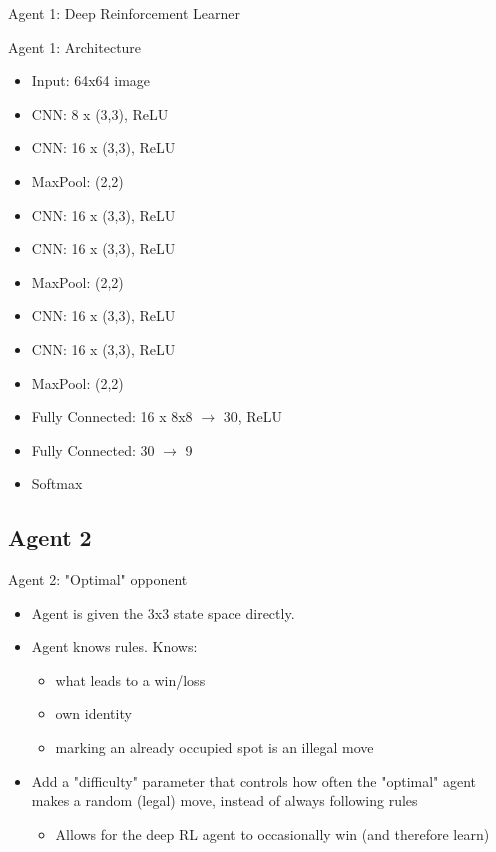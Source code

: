 \documentclass[11pt]{beamer}
\begin{document}
\begin{frame}{Agent 1: Deep Reinforcement Learner}
\begin{minipage}[t]{0.45\linewidth}
\begin{figure}[tttDL]
		\end{figure}
	\end{minipage}
\end{frame}

\begin{frame}{Agent 1: Architecture}
	\begin{itemize}
		\item Input: 64x64 image
		\item CNN: 8  x (3,3), ReLU
		\item[] CNN: 16 x (3,3), ReLU
		\item[] MaxPool: (2,2)
		\item CNN: 16 x (3,3), ReLU
		\item[] CNN: 16 x (3,3), ReLU
		\item[] MaxPool: (2,2)
		\item CNN: 16 x (3,3), ReLU
		\item[] CNN: 16 x (3,3), ReLU
		\item[] MaxPool: (2,2)
		\item Fully Connected: 16 x 8x8 $\rightarrow$ 30, ReLU
		\item Fully Connected: 30 $\rightarrow$ 9
		\item Softmax
	\end{itemize}
\end{frame}

\subsection{Agent 2}
\begin{frame}{Agent 2: "Optimal" opponent}
	\begin{itemize}
		\item Agent is given the 3x3 state space directly.
		\item Agent knows rules. Knows:
		\begin{itemize}
			\item what leads to a win/loss
			\item own identity
			\item marking an already occupied spot is an illegal move
		\end{itemize}
		\item Add a "difficulty" parameter that controls how often the "optimal" agent makes a random (legal) move, instead of always following rules
		\begin{itemize}
			\item Allows for the deep RL agent to occasionally win (and therefore learn)
		\end{itemize}	
	\end{itemize}
\end{frame}
\end{document}

